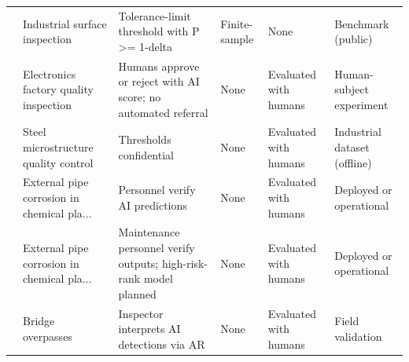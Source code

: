 \begin{table}[t]
\begin{tabularx}{\textwidth}{p{}p{}Yp{0.12\textwidth}p{0.12\textwidth}p{0.11\textwidth}}
\cite{deng2026distribution} & Industrial surface inspection & Tolerance-limit threshold with P >= 1-delta & Finite-sample & None & Benchmark (public) \\
\cite{senoner2024explainable} & Electronics factory quality inspection & Humans approve or reject with AI score; no automated referral & None & Evaluated with humans & Human-subject experiment \\
\cite{durmaz2023microstructure} & Steel microstructure quality control & Thresholds confidential & None & Evaluated with humans & Industrial dataset (offline) \\
\cite{shimbo2023pipe} & External pipe corrosion in chemical pla... & Personnel verify AI predictions & None & Evaluated with humans & Deployed or operational \\
\cite{shimbo2023operation} & External pipe corrosion in chemical pla... & Maintenance personnel verify outputs; high-risk-rank model planned & None & Evaluated with humans & Deployed or operational \\
\cite{lapointe2022for} & Bridge overpasses & Inspector interprets AI detections via AR & None & Evaluated with humans & Field validation \\
\bottomrule
\end{tabularx}
\end{table}
